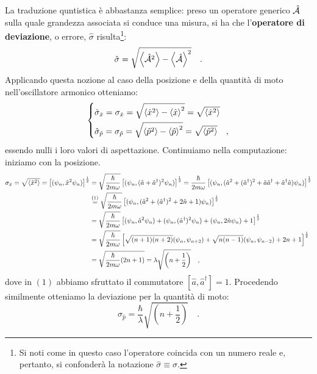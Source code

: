La traduzione quntistica è abbastanza semplice: preso un operatore generico $\hat{\mathcal{A}}$ sulla quale grandezza associata si conduce una misura, si ha che l'\textbf{operatore di deviazione}, o errore, $\hat{\sigma}$ risulta\footnote{Si noti come in questo caso l'operatore coincida con un numero reale e, pertanto, si confonderà la notazione $\hat{\sigma} \equiv \sigma$.}:
\[
    \hat{\sigma} = \sqrt{\left\langle \hat{\mathcal{A}}^2 \right\rangle - \left\langle \hat{\mathcal{A}} \right\rangle^2} \quad.
\] 
Applicando questa nozione al caso della posizione e della quantità di moto nell'oscillatore armonico otteniamo:
\[
    \begin{dcases}
        \hat{\sigma}_{\hat{x}} = {\sigma}_{\hat{x}} = \sqrt{\left\langle \hat{x}^2 \right\rangle - \left\langle \hat{x} \right\rangle^2} = \sqrt{\left\langle \hat{x}^2 \right\rangle} \\
        \hat{\sigma}_{\hat{p}} = {\sigma}_{\hat{p}} = \sqrt{\left\langle \hat{p}^2 \right\rangle - \left\langle \hat{p} \right\rangle^2} = \sqrt{\left\langle \hat{p}^2 \right\rangle} \quad,
    \end{dcases}
\]
essendo nulli i loro valori di aspettazione. Continuiamo nella computazione: iniziamo con la posizione.
\[
    \begin{aligned}
        \sigma_{\hat{x}} = \sqrt{\left\langle \hat{x}^2 \right\rangle} = \left[(\psi_n,\hat{x}^2\psi_n)\right]^{\frac{1}{2}} &= \sqrt{\frac{\hbar}{2m\omega}}\left[(\psi_n,(\hat{a}+ \hat{a}^\dagger)^2\psi_n)\right]^{\frac{1}{2}} = \frac{\hbar}{2m\omega}\left[(\psi_n,(\hat{a}^2+ (\hat{a}^\dagger)^2 + \hat{a}\hat{a}^\dagger + \hat{a}^\dagger\hat{a})\psi_n)\right]^{\frac{1}{2}} \\
        &\overset{(1)}{=}\sqrt{\frac{\hbar}{2m\omega}} \left[(\psi_n,(\hat{a}^2 + (\hat{a}^\dagger)^2 + 2\hat{n} + 1)\psi_n)\right]^{\frac{1}{2}} \\ &=\sqrt{\frac{\hbar}{2m\omega}} \left[(\psi_n,\hat{a}^2\psi_n) + (\psi_n,(\hat{a}^\dagger)^2\psi_n) + (\psi_n,2\hat{n}\psi_n) + 1\right]^{\frac{1}{2}} \\
        &=\sqrt{\frac{\hbar}{2m\omega}} \left[\sqrt{(n+1)(n+2)}(\psi_n,\psi_{n+2}) + \sqrt{n(n-1)}(\psi_n,\psi_{n-2}) + 2n + 1\right]^{\frac{1}{2}} \\
        &= \sqrt{\frac{\hbar}{2m\omega}(2n+1)} = \lambda\sqrt{\left( n+\frac{1}{2} \right)} \quad,
    \end{aligned}
\]
dove in $(1)$ abbiamo sfruttato il commutatore $[\hat{a},\hat{a}^\dagger] = 1$. Procedendo similmente otteniamo la deviazione per la quantità di moto:
\[
    \sigma_{\hat{p}} = \frac{\hbar}{\lambda}\sqrt{\left( n+\frac{1}{2} \right)} \quad.
\]

